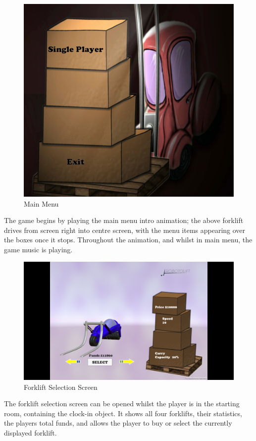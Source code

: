 \documentclass[12pt]{article}
\begin{document}
\begin{figure}[H]
	\caption{Main Menu}
	\includegraphics[width=\textwidth]{images/mainMenu}
\end{figure}
The game begins by playing the main menu intro animation; the above forklift drives from screen right into centre screen, with the menu items appearing over the boxes once it stops. Throughout the animation, and whilst in main menu, the game music is playing. 

\begin{figure}[H]
	\caption{Forklift Selection Screen}
	\includegraphics[width=\textwidth]{images/forkliftSelect}
\end{figure}
The forklift selection screen can be opened whilst the player is in the starting room, containing the clock-in object. It shows all four forklifts, their statistics, the players total funds, and allows the player to buy or select the currently displayed forklift. 
\end{document}
